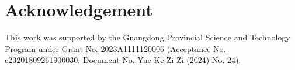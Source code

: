 \documentclass[lettersize,journal]{IEEEtran}
\begin{document}
\section*{Acknowledgement}
This work was supported by the Guangdong Provincial Science and Technology Program under Grant No. 2023A1111120006 (Acceptance No. c23201809261900030; Document No. Yue Ke Zi Zi (2024) No. 24).




\vfill
\end{document}
